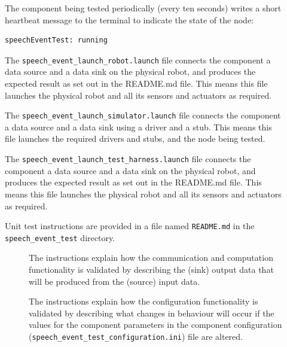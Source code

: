 \documentclass{CSSRforAfrica}
\newcommand{\checkboxChecked}{\fbox{\ding{51}}} %
\newcommand{\checkboxDashed}{\fbox{--}}         %
\begin{document}
\begin{description}
\item[\checkboxChecked]   The component being tested periodically (every ten seconds) writes a short heartbeat message to the terminal to indicate the state of the node:
{\small 
\begin{verbatim}
speechEventTest: running
\end{verbatim}}

\item[\checkboxChecked] The {\small \verb+speech_event_launch_robot.launch+} file connects the component a data source and a data sink on the physical robot, and produces the expected result as set out in the README.md file. This means this file launches the physical robot and all its sensors and actuators as required.

\item[\checkboxDashed]   The {\small \verb+speech_event_launch_simulator.launch+} file connects the component a data source and a data sink using a driver and a stub. This means this file launches the required drivers and stubs, and the node being tested.

\item[\checkboxChecked]   The {\small \verb+speech_event_launch_test_harness.launch+} file connects the component a data source and a data sink on the physical robot, and produces the expected result as set out in the README.md file. This means this file launches the physical robot and all its sensors and actuators as required.

\item[\checkboxChecked] Unit test instructions are provided in a file named {\small \verb+README.md+} in the  {\small \verb+speech_event_test+} directory. 


\begin{description}

\item[\checkboxChecked] The instructions explain how the communication and computation functionality is validated by describing the (sink) output data that will be produced from the (source) input data.  

\item[\checkboxChecked] The instructions explain how the configuration functionality is validated by describing what changes in behaviour will occur if the values for the component parameters in the component configuration ({\small \verb+speech_event_test_configuration.ini+}) file are altered.

\end{description}
\end{description}
\newpage
\end{document}
